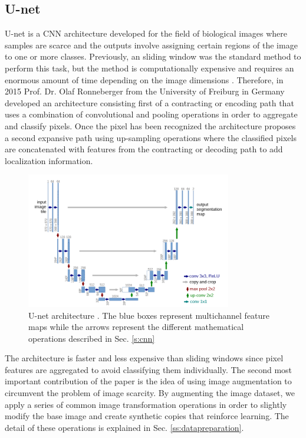 \documentclass[12pt,a4paper]{scrartcl}
\begin{document}
\subsection{U-net}

U-net is a CNN architecture developed for the field of biological images where samples are scarce and the outputs involve assigning certain regions of the image to one or more classes. Previously, an sliding window was the standard method to perform this task, but the method is computationally expensive and requires an enormous amount of time depending on the image dimensions \cite{Ronneberger2015}. Therefore, in 2015 Prof. Dr. Olaf Ronneberger from the University of Freiburg in Germany developed an architecture consisting first of a contracting or encoding path that uses a combination of convolutional and pooling operations in order to aggregate and classify pixels. Once the pixel has been recognized the architecture proposes a second expansive path using up-sampling operations where the classified pixels are concatenated with features from the contracting or decoding path to add localization information. 

\begin{figure}[H]
    \centering
    \includegraphics[width=0.8\textwidth]{./images/Unet-architecture.png}
    \caption{U-net architecture \cite{Ronneberger2015}. The blue boxes represent multichannel feature maps while the arrows represent the different mathematical operations described in Sec. \ref{s:cnn}    }
\end{figure}

The architecture is faster and less expensive than sliding windows since pixel features are aggregated to avoid classifying them individually. The second most important contribution of the paper is the idea of using image augmentation to circumvent the problem of image scarcity. By augmenting the image dataset, we apply a series of common image transformation operations in order to slightly modify the base image and create synthetic copies that reinforce learning. The detail of these operations is explained in Sec. \ref{ss:datapreparation}.
\end{document}
